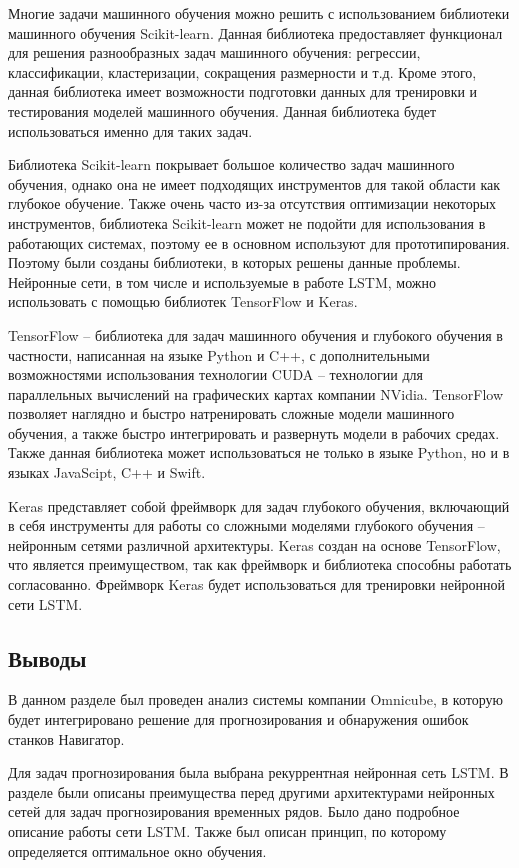 Многие задачи машинного обучения
можно решить с использованием библиотеки машинного обучения Scikit-learn.
Данная библиотека предоставляет функционал для решения разнообразных
задач машинного обучения: регрессии, классификации, кластеризации, сокращения размерности и т.д.
Кроме этого, данная библиотека имеет возможности подготовки данных
для тренировки и тестирования моделей машинного обучения.
Данная библиотека будет использоваться именно для таких задач.


Библиотека Scikit-learn покрывает большое количество задач машинного обучения,
однако она не имеет подходящих инструментов для такой области как глубокое обучение.
Также очень часто из-за отсутствия оптимизации некоторых инструментов,
библиотека Scikit-learn может не подойти для использования в работающих системах,
поэтому ее в основном используют для прототипирования.
Поэтому были созданы библиотеки, в которых решены данные проблемы.
Нейронные сети, в том числе и используемые в работе LSTM,
можно использовать с помощью библиотек TensorFlow и Keras.

TensorFlow -- библиотека для задач машинного обучения и глубокого обучения в частности,
написанная на языке Python и C++,
с дополнительными возможностями использования технологии CUDA
-- технологии для параллельных вычислений на графических картах компании NVidia.
TensorFlow позволяет наглядно и быстро натренировать сложные модели машинного обучения,
а также быстро интегрировать и развернуть модели в рабочих средах.
Также данная библиотека может использоваться не только в языке Python,
но и в языках JavaScipt, C++ и Swift.

Keras представляет собой фреймворк для задач глубокого обучения,
включающий в себя инструменты для работы со сложными моделями глубокого обучения -- нейронным сетями различной архитектуры.
Keras создан на основе TensorFlow, что является преимуществом, так как фреймворк и библиотека способны работать согласованно.
Фреймворк Keras будет использоваться для тренировки нейронной сети LSTM.

\subsection{Выводы}

В данном разделе был проведен анализ системы компании Omnicube, в которую
будет интегрировано решение для прогнозирования и обнаружения ошибок станков Навигатор.

Для задач прогнозирования была выбрана рекуррентная нейронная сеть LSTM.
В разделе были описаны преимущества перед другими архитектурами нейронных сетей
для задач прогнозирования временных рядов.
Было дано подробное описание работы сети LSTM.
Также был описан принцип, по которому определяется оптимальное окно обучения.

